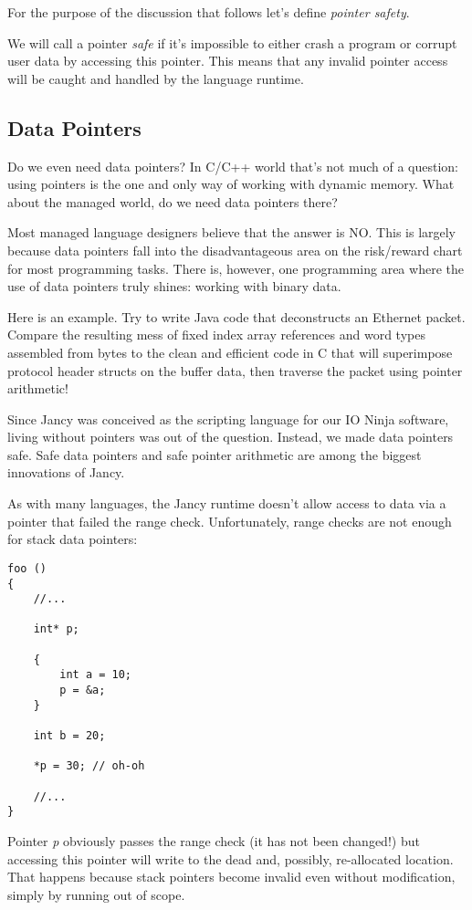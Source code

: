 \documentclass[oneside]{book}
\begin{document}
For the purpose of the discussion that follows let's define \emph{pointer safety}.

We will call a pointer \emph{safe} if it's impossible to either crash a program or corrupt user data by accessing this pointer. This means that any invalid pointer access will be caught and handled by the language runtime.

\subsection{Data Pointers}

Do we even need data pointers? In C/C++ world that's not much of a question: using pointers is the one and only way of working with dynamic memory. What about the managed world, do we need data pointers there?

Most managed language designers believe that the answer is NO. This is largely because data pointers fall into the disadvantageous area on the risk/reward chart for most programming tasks. There is, however, one programming area where the use of data pointers truly shines: working with binary data.

Here is an example. Try to write Java code that deconstructs an Ethernet packet. Compare the resulting mess of fixed index array references and word types assembled from bytes to the clean and efficient code in C that will superimpose protocol header structs on the buffer data, then traverse the packet using pointer arithmetic!

Since Jancy was conceived as the scripting language for our IO Ninja software, living without pointers was out of the question. Instead, we made data pointers safe. Safe data pointers and safe pointer arithmetic are among the biggest innovations of Jancy.

As with many languages, the Jancy runtime doesn't allow access to data via a pointer that failed the range check. Unfortunately, range checks are not enough for stack data pointers:

\begin{lstlisting}
foo ()
{
    //...

    int* p;

    {
        int a = 10;
        p = &a;
    }

    int b = 20;

    *p = 30; // oh-oh

    //...
}
\end{lstlisting}

Pointer \emph{p} obviously passes the range check (it has not been changed!) but accessing this pointer will write to the dead and, possibly, re-allocated location. That happens because stack pointers become invalid even without modification, simply by running out of scope.
\end{document}
